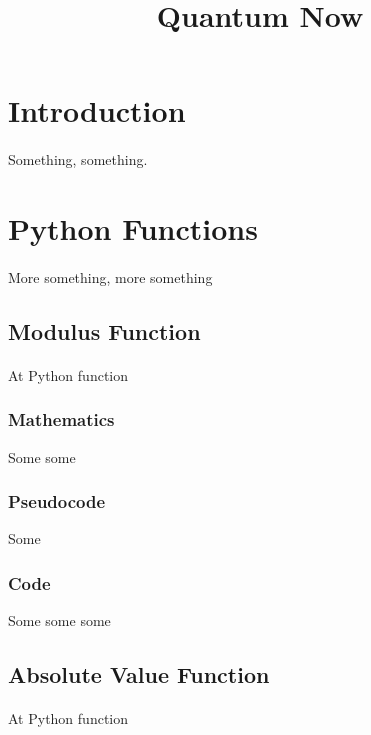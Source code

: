 \documentclass{article}
\title{Quantum Now}
\begin{document}
	\setlength{\columnsep}{20pt}
	\setlength{\columnseprule}{1pt}

	\maketitle
	\tableofcontents

	\section{Introduction}
	\paragraph{}
	Something, something.

	\section{Python Functions}
	\paragraph{}
	More something, more something
		\subsection{Modulus Function}
		\paragraph{}
		At Python function
			\subsubsection{Mathematics}
			Some some
			\subsubsection{Pseudocode}
			Some
			\subsubsection{Code}
			Some some some
		\subsection{Absolute Value Function}
		\paragraph{}
		At Python function
		
\end{document}
